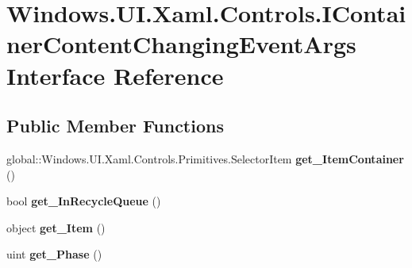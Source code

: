 \hypertarget{interface_windows_1_1_u_i_1_1_xaml_1_1_controls_1_1_i_container_content_changing_event_args}{}\section{Windows.\+U\+I.\+Xaml.\+Controls.\+I\+Container\+Content\+Changing\+Event\+Args Interface Reference}
\label{interface_windows_1_1_u_i_1_1_xaml_1_1_controls_1_1_i_container_content_changing_event_args}
\subsection*{Public Member Functions}
\begin{DoxyCompactItemize}
\item 
\mbox{\label{interface_windows_1_1_u_i_1_1_xaml_1_1_controls_1_1_i_container_content_changing_event_args_acbc05dfed05ddf98a734f2dfef63244c}} 
global\+::\+Windows.\+U\+I.\+Xaml.\+Controls.\+Primitives.\+Selector\+Item {\bfseries get\+\_\+\+Item\+Container} ()
\item 
\mbox{\label{interface_windows_1_1_u_i_1_1_xaml_1_1_controls_1_1_i_container_content_changing_event_args_a4d50cd4c2e41b7824eb299ae3a98881b}} 
bool {\bfseries get\+\_\+\+In\+Recycle\+Queue} ()
\item 
\mbox{\label{interface_windows_1_1_u_i_1_1_xaml_1_1_controls_1_1_i_container_content_changing_event_args_a10ddd7510b58dc1746dc1d24aa4f40ae}} 
object {\bfseries get\+\_\+\+Item} ()
\item 
\mbox{\label{interface_windows_1_1_u_i_1_1_xaml_1_1_controls_1_1_i_container_content_changing_event_args_a738ad9fa4dbda62eecb572e7177f20c5}} 
uint {\bfseries get\+\_\+\+Phase} ()
\item 
\mbox{\label{interface_windows_1_1_u_i_1_1_xaml_1_1_controls_1_1_i_container_content_changing_event_args_a667cd37ef9c242308e80a5eeb302226a}} 

\end{DoxyCompactItemize}
